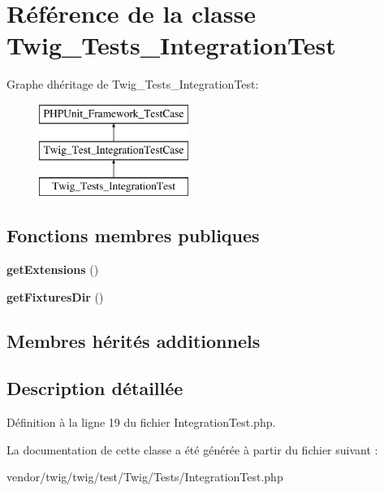\hypertarget{class_twig___tests___integration_test}{}\section{Référence de la classe Twig\+\_\+\+Tests\+\_\+\+Integration\+Test}
\label{class_twig___tests___integration_test}
Graphe d\textquotesingle{}héritage de Twig\+\_\+\+Tests\+\_\+\+Integration\+Test\+:\begin{figure}[H]
\begin{center}
\leavevmode
\includegraphics[height=3.000000cm]{class_twig___tests___integration_test}
\end{center}
\end{figure}
\subsection*{Fonctions membres publiques}
\begin{DoxyCompactItemize}
\item 
{\bfseries get\+Extensions} ()\hypertarget{class_twig___tests___integration_test_a0bf1cdb692f876fae6acd2bfbb548244}{}\label{class_twig___tests___integration_test_a0bf1cdb692f876fae6acd2bfbb548244}

\item 
{\bfseries get\+Fixtures\+Dir} ()\hypertarget{class_twig___tests___integration_test_a497128a4b6ea4dae7ab2be44290823aa}{}\label{class_twig___tests___integration_test_a497128a4b6ea4dae7ab2be44290823aa}

\end{DoxyCompactItemize}
\subsection*{Membres hérités additionnels}


\subsection{Description détaillée}


Définition à la ligne 19 du fichier Integration\+Test.\+php.



La documentation de cette classe a été générée à partir du fichier suivant \+:\begin{DoxyCompactItemize}
\item 
vendor/twig/twig/test/\+Twig/\+Tests/Integration\+Test.\+php\end{DoxyCompactItemize}
